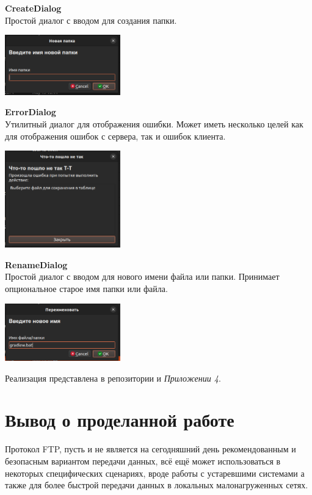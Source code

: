 \documentclass[a4paper,14pt]{extarticle}
\begin{document}
\textbf{CreateDialog}\\
Простой диалог с вводом для создания папки.
\begin{center}
\includegraphics[width=50mm]{create_dialog}
\end{center}

\textbf{ErrorDialog}\\
Утилитный диалог для отображения ошибки. Может иметь несколько целей как для отображения 
ошибок с сервера, так и ошибок клиента. 
\begin{center}
\includegraphics[width=50mm]{error_dialog}
\end{center}

\textbf{RenameDialog}\\
Простой диалог с вводом для нового имени файла или папки. Принимает опциональное старое имя папки
или файла.
\begin{center}
\includegraphics[width=50mm]{rename_dialog}
\end{center}

Реализация представлена в репозитории и \textit{Приложении 4}.

\newpage

\section{Вывод о проделанной работе}
Протокол FTP, пусть и не является на сегодняшний день рекомендованным и безопасным вариантом 
передачи данных, всё ещё может использоваться в некоторых специфических сценариях, вроде 
работы с устаревшими системами а также для более быстрой передачи данных в локальных малонагруженных 
сетях. 
\end{document}
